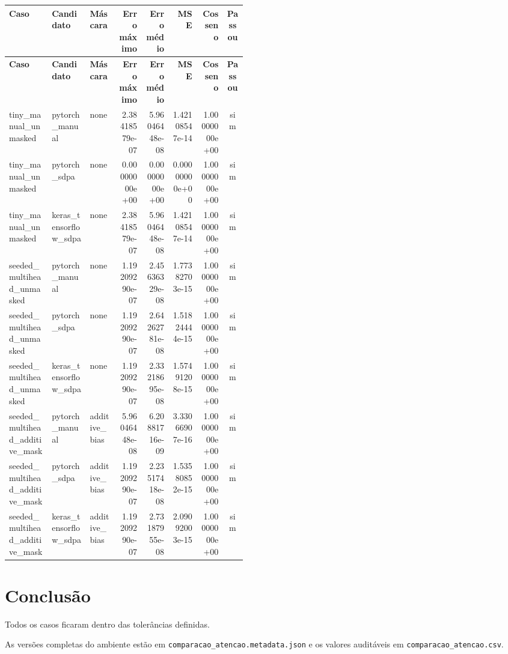 \begin{landscape}
\scriptsize
\begin{longtable}{@{}p{0.18\linewidth}p{0.16\linewidth}p{0.12\linewidth}rrrrc@{}}
\toprule
\textbf{Caso} & \textbf{Candidato} & \textbf{Máscara} & \textbf{Erro máximo} & \textbf{Erro médio} & \textbf{MSE} & \textbf{Cosseno} & \textbf{Passou} \\
\midrule
\endfirsthead
\toprule
\textbf{Caso} & \textbf{Candidato} & \textbf{Máscara} & \textbf{Erro máximo} & \textbf{Erro médio} & \textbf{MSE} & \textbf{Cosseno} & \textbf{Passou} \\
\midrule
\endhead
tiny\_\allowbreak{}manual\_\allowbreak{}unmasked & pytorch\_\allowbreak{}manual & none & 2.38418579e-07 & 5.96046448e-08 & 1.42108547e-14 & 1.00000000e+00 & sim \\
tiny\_\allowbreak{}manual\_\allowbreak{}unmasked & pytorch\_\allowbreak{}sdpa & none & 0.00000000e+00 & 0.00000000e+00 & 0.00000000e+00 & 1.00000000e+00 & sim \\
tiny\_\allowbreak{}manual\_\allowbreak{}unmasked & keras\_\allowbreak{}tensorflow\_\allowbreak{}sdpa & none & 2.38418579e-07 & 5.96046448e-08 & 1.42108547e-14 & 1.00000000e+00 & sim \\
seeded\_\allowbreak{}multihead\_\allowbreak{}unmasked & pytorch\_\allowbreak{}manual & none & 1.19209290e-07 & 2.45636329e-08 & 1.77382703e-15 & 1.00000000e+00 & sim \\
seeded\_\allowbreak{}multihead\_\allowbreak{}unmasked & pytorch\_\allowbreak{}sdpa & none & 1.19209290e-07 & 2.64262781e-08 & 1.51824444e-15 & 1.00000000e+00 & sim \\
seeded\_\allowbreak{}multihead\_\allowbreak{}unmasked & keras\_\allowbreak{}tensorflow\_\allowbreak{}sdpa & none & 1.19209290e-07 & 2.33218695e-08 & 1.57491208e-15 & 1.00000000e+00 & sim \\
seeded\_\allowbreak{}multihead\_\allowbreak{}additive\_\allowbreak{}mask & pytorch\_\allowbreak{}manual & additive\_\allowbreak{}bias & 5.96046448e-08 & 6.20881716e-09 & 3.33066907e-16 & 1.00000000e+00 & sim \\
seeded\_\allowbreak{}multihead\_\allowbreak{}additive\_\allowbreak{}mask & pytorch\_\allowbreak{}sdpa & additive\_\allowbreak{}bias & 1.19209290e-07 & 2.23517418e-08 & 1.53580852e-15 & 1.00000000e+00 & sim \\
seeded\_\allowbreak{}multihead\_\allowbreak{}additive\_\allowbreak{}mask & keras\_\allowbreak{}tensorflow\_\allowbreak{}sdpa & additive\_\allowbreak{}bias & 1.19209290e-07 & 2.73187955e-08 & 2.09092003e-15 & 1.00000000e+00 & sim \\
\bottomrule
\end{longtable}
\end{landscape}

\section{Conclusão}

Todos os casos ficaram dentro das tolerâncias definidas.

As versões completas do ambiente estão em \texttt{comparacao\_\allowbreak{}atencao.metadata.json} e os valores auditáveis em \texttt{comparacao\_\allowbreak{}atencao.csv}.
